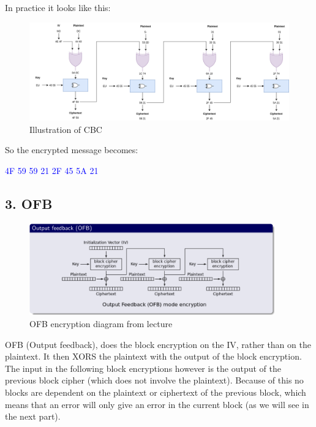 \documentclass{article}
\begin{document}
In practice it looks like this: 
\begin{figure}[H]
 \centering
  \includegraphics[width=400pt]{img/CBC.png}
 \caption{Illustration of CBC}
 \end{figure}

So the encrypted message becomes:
\begin{tcolorbox}
\begin{center}
\textcolor{blue}{
\qquad 4F 59 59 21 2F 45 5A 21}
\end{center}
\end{tcolorbox}





\newpage
\subsection{3. OFB}


\begin{figure}[H]
 \centering
  \includegraphics[width=300pt]{img/ofbEnLecture.png}
 \caption{OFB encryption diagram from lecture}
 \end{figure}

OFB (Output feedback), does the block encryption on the IV, rather than on the plaintext. It then XORS the plaintext with the output of the block encryption. The input in the following block encryptions however is the output of the previous block cipher (which does not involve the plaintext). Because of this no blocks are dependent on the plaintext or ciphertext of the previous block, which means that an error will only give an error in the current block (as we will see in the next part). 
\end{document}
